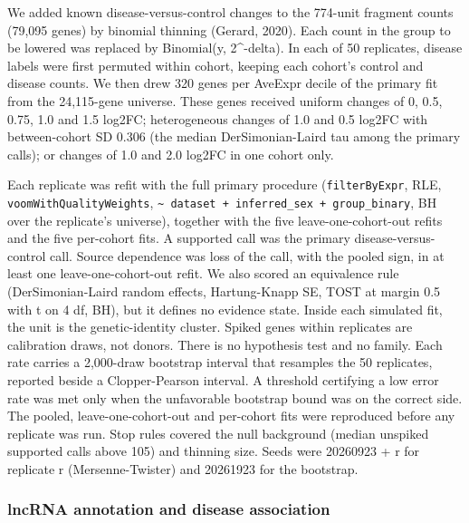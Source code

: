 We added known disease-versus-control changes to the 774-unit fragment counts (79,095 genes) by binomial thinning (Gerard, 2020). Each count in the group to be lowered was replaced by Binomial(y, 2\^{}-\textbar delta\textbar). In each of 50 replicates, disease labels were first permuted within cohort, keeping each cohort's control and disease counts. We then drew 320 genes per AveExpr decile of the primary fit from the 24,115-gene universe. These genes received uniform changes of 0, 0.5, 0.75, 1.0 and 1.5 log2FC; heterogeneous changes of 1.0 and 0.5 log2FC with between-cohort SD 0.306 (the median DerSimonian-Laird tau among the primary calls); or changes of 1.0 and 2.0 log2FC in one cohort only.

Each replicate was refit with the full primary procedure (\texttt{filterByExpr}, RLE, \texttt{voomWithQualityWeights}, \texttt{\textasciitilde{}\ dataset\ +\ inferred\_\allowbreak{}sex\ +\ group\_\allowbreak{}binary}, BH over the replicate's universe), together with the five leave-one-cohort-out refits and the five per-cohort fits. A supported call was the primary disease-versus-control call. Source dependence was loss of the call, with the pooled sign, in at least one leave-one-cohort-out refit. We also scored an equivalence rule (DerSimonian-Laird random effects, Hartung-Knapp SE, TOST at margin 0.5 with t on 4 df, BH), but it defines no evidence state. Inside each simulated fit, the unit is the genetic-identity cluster. Spiked genes within replicates are calibration draws, not donors. There is no hypothesis test and no family. Each rate carries a 2,000-draw bootstrap interval that resamples the 50 replicates, reported beside a Clopper-Pearson interval. A threshold certifying a low error rate was met only when the unfavorable bootstrap bound was on the correct side. The pooled, leave-one-cohort-out and per-cohort fits were reproduced before any replicate was run. Stop rules covered the null background (median unspiked supported calls above 105) and thinning size. Seeds were 20260923 + r for replicate r (Mersenne-Twister) and 20261923 for the bootstrap.

\subsubsection{lncRNA annotation and disease association}\label{lncrna-annotation-and-disease-association}

